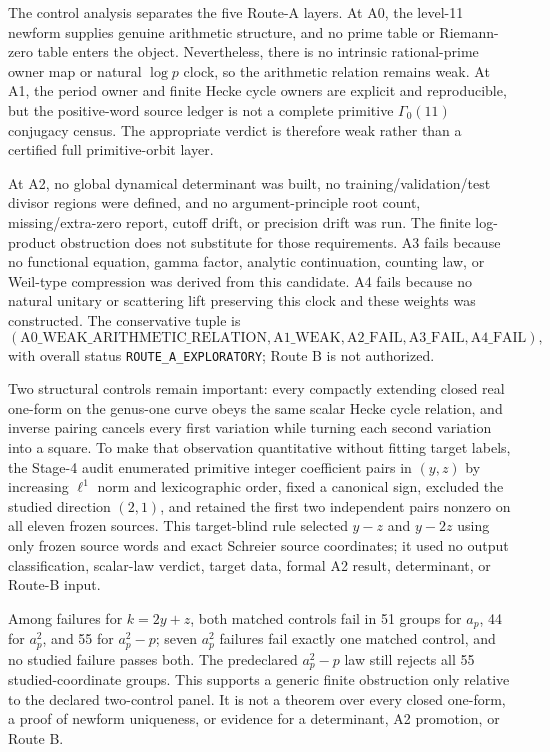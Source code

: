 \documentclass[11pt]{article}
\theoremstyle{definition}
\theoremstyle{remark}
\newcommand{\G}{\Gamma_0(11)}
\begin{document}
The control analysis separates the five Route-A layers. At A0, the level-11 newform supplies genuine arithmetic structure, and no prime table or Riemann-zero table enters the object. Nevertheless, there is no intrinsic rational-prime owner map or natural $\log p$ clock, so the arithmetic relation remains weak. At A1, the period owner and finite Hecke cycle owners are explicit and reproducible, but the positive-word source ledger is not a complete primitive $\G$ conjugacy census. The appropriate verdict is therefore weak rather than a certified full primitive-orbit layer.

At A2, no global dynamical determinant was built, no training/validation/test divisor regions were defined, and no argument-principle root count, missing/extra-zero report, cutoff drift, or precision drift was run. The finite log-product obstruction does not substitute for those requirements. A3 fails because no functional equation, gamma factor, analytic continuation, counting law, or Weil-type compression was derived from this candidate. A4 fails because no natural unitary or scattering lift preserving this clock and these weights was constructed. The conservative tuple is
\[
(\mathrm{A0\_WEAK\_ARITHMETIC\_RELATION},
\mathrm{A1\_WEAK},\mathrm{A2\_FAIL},\mathrm{A3\_FAIL},\mathrm{A4\_FAIL}),
\]
with overall status \texttt{ROUTE\_A\_EXPLORATORY}; Route B is not authorized.

Two structural controls remain important: every compactly extending closed real one-form on the genus-one curve obeys the same scalar Hecke cycle relation, and inverse pairing cancels every first variation while turning each second variation into a square. To make that observation quantitative without fitting target labels, the Stage-4 audit enumerated primitive integer coefficient pairs in $(y,z)$ by increasing $\ell^1$ norm and lexicographic order, fixed a canonical sign, excluded the studied direction $(2,1)$, and retained the first two independent pairs nonzero on all eleven frozen sources. This target-blind rule selected $y-z$ and $y-2z$ using only frozen source words and exact Schreier source coordinates; it used no output classification, scalar-law verdict, target data, formal A2 result, determinant, or Route-B input.

Among failures for $k=2y+z$, both matched controls fail in 51 groups for $a_p$, 44 for $a_p^2$, and 55 for $a_p^2-p$; seven $a_p^2$ failures fail exactly one matched control, and no studied failure passes both. The predeclared $a_p^2-p$ law still rejects all 55 studied-coordinate groups. This supports a generic finite obstruction only relative to the declared two-control panel. It is not a theorem over every closed one-form, a proof of newform uniqueness, or evidence for a determinant, A2 promotion, or Route B.
\end{document}
